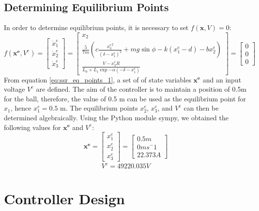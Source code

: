 \documentclass[a4paper,10pt,reqno]{amsart}
\numberwithin{equation}{section}
\begin{document}
\subsection{Determining Equilibrium Points} In order to determine equilibrium points, it is necessary to set $f(\mathbf x, V)=0$:
\begin{equation}
\label{eq:ssr_eq_points_1}
    f(\mathbf{x^e}, V^e) = \begin{bmatrix} 
        \dot x_1^e \\ 
        \dot x_2^e \\ 
        \dot x_3^e 
    \end{bmatrix} = \begin{bmatrix}
        x_2 \\
        \frac{5}{7m}(c\frac{{x_3^e}^2}{(\delta-x_1^e)^2}+mg\sin{\phi}-k(x_1^e-d)-bx_2^e) \\
        \frac{V-x_3^eR}{L_0+L_1\exp{-\alpha(-\delta-x_1^e)}}
    \end{bmatrix} = \begin{bmatrix}
        0 \\
        0 \\
        0
    \end{bmatrix}
\end{equation}
From equation \eqref{eq:ssr_eq_points_1}, a set of of state variables $\mathbf{x^e}$ and an input voltage $V^e$ are defined. The aim of the controller is to maintain a position of 0.5m for the ball, therefore, the value of 0.5 m can be used as the equilibrium point for $x_1$, hence $x_1^e=0.5$ m. The equilibrium points $x_2^e$, $x_3^e$, and $V^e$ can then be determined algebraically. Using the Python module sympy, we obtained the following values for $\mathbf{x^e}$ and $V^e$:
\begin{equation}
    \mathbf{x^e} = \begin{bmatrix}
        x_1^e \\
        x_2^e \\
        x_3^e
    \end{bmatrix} = \begin{bmatrix}
        0.5m \\
        0ms^-1 \\
        22.373A
    \end{bmatrix}
\end{equation}
\begin{align}
    V^e = 49220.035V
\end{align}


\section{Controller Design}
\end{document}
